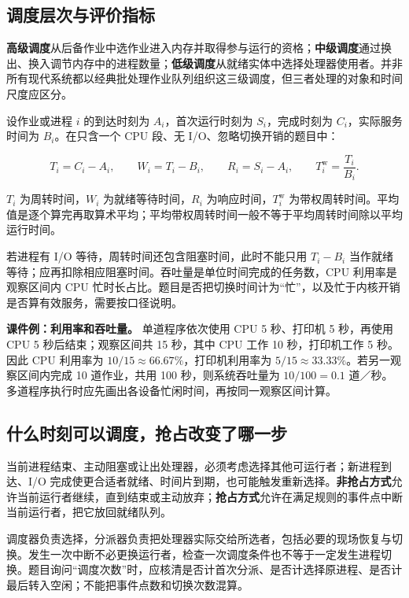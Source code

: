 \subsection{调度层次与评价指标}\label{OS02-2-6}

\textbf{高级调度}从后备作业中选作业进入内存并取得参与运行的资格；\textbf{中级调度}通过换出、换入调节内存中的进程数量；\textbf{低级调度}从就绪实体中选择处理器使用者。并非所有现代系统都以经典批处理作业队列组织这三级调度，但三者处理的对象和时间尺度应区分。

设作业或进程 \(i\) 的到达时刻为 \(A_i\)，首次运行时刻为 \(S_i\)，完成时刻为 \(C_i\)，实际服务时间为 \(B_i\)。在只含一个 CPU 段、无 I/O、忽略切换开销的题目中：

\[
T_i=C_i-A_i,\qquad W_i=T_i-B_i,\qquad R_i=S_i-A_i,\qquad T_i^{\mathrm{w}}=\frac{T_i}{B_i}.
\]

\(T_i\) 为周转时间，\(W_i\) 为就绪等待时间，\(R_i\) 为响应时间，\(T_i^{\mathrm{w}}\) 为带权周转时间。平均值是逐个算完再取算术平均；平均带权周转时间一般不等于平均周转时间除以平均运行时间。

若进程有 I/O 等待，周转时间还包含阻塞时间，此时不能只用 \(T_i-B_i\) 当作就绪等待；应再扣除相应阻塞时间。吞吐量是单位时间完成的任务数，CPU 利用率是观察区间内 CPU 忙时长占比。题目是否把切换时间计为``忙''，以及忙于内核开销是否算有效服务，需要按口径说明。

\textbf{课件例：利用率和吞吐量。} 单道程序依次使用 CPU 5 秒、打印机 5 秒，再使用 CPU 5 秒后结束；观察区间共 15 秒，其中 CPU 工作 10 秒，打印机工作 5 秒。因此 CPU 利用率为 \(10/15\approx66.67\%\)，打印机利用率为 \(5/15\approx33.33\%\)。若另一观察区间内完成 10 道作业，共用 100 秒，则系统吞吐量为 \(10/100=0.1\) 道／秒。多道程序执行时应先画出各设备忙闲时间，再按同一观察区间计算。

\subsection{什么时刻可以调度，抢占改变了哪一步}\label{OS02-2-7}

当前进程结束、主动阻塞或让出处理器，必须考虑选择其他可运行者；新进程到达、I/O 完成使更合适者就绪、时间片到期，也可能触发重新选择。\textbf{非抢占方式}允许当前运行者继续，直到结束或主动放弃；\textbf{抢占方式}允许在满足规则的事件点中断当前运行者，把它放回就绪队列。

调度器负责选择，分派器负责把处理器实际交给所选者，包括必要的现场恢复与切换。发生一次中断不必更换运行者，检查一次调度条件也不等于一定发生进程切换。题目询问``调度次数''时，应核清是否计首次分派、是否计选择原进程、是否计最后转入空闲；不能把事件点数和切换次数混算。

